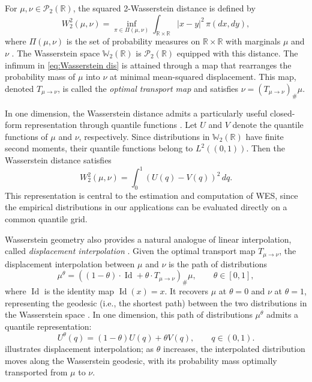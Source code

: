 \documentclass[a4paper, 11pt]{article}
\newcommand{\R}{\mathbb{R}}
\theoremstyle{definition}
\begin{document}
For $\mu,\nu\in\mathcal P_2(\R)$, the squared 2-Wasserstein distance is defined by
\begin{equation}\label{eq:Wasserstein dis}
W_2^2(\mu,\nu)
=
\inf_{\pi\in\Pi(\mu,\nu)}
\int_{\R\times\R} |x-y|^2\,\pi(dx,dy),
\end{equation}
where $\Pi(\mu,\nu)$ is the set of probability measures on $\R\times\R$ with marginals $\mu$ and $\nu$ \citep{villani2009optimal}.
The Wasserstein space $\mathbb{W}_2(\R)$ is $\mathcal P_2(\R)$ equipped with this distance.
The infimum in \eqref{eq:Wasserstein dis} is attained through a map that rearranges the probability mass of $\mu$ into $\nu$ at minimal mean-squared displacement.
This map, denoted $T_{\mu \to \nu}$, is called the \emph{optimal transport map} and satisfies $\nu = ( T_{\mu \to \nu} )_{\#} \mu$.

In one dimension, the Wasserstein distance admits a particularly useful closed-form representation through quantile functions \citep{Panaretos2020}. 
Let $U$ and $V$ denote the quantile functions of $\mu$ and $\nu$, respectively. 
Since distributions in $\mathbb{W}_2(\R)$ have finite second moments, their quantile functions belong to $L^2((0,1))$.
Then the Wasserstein distance satisfies
\begin{equation}\label{eq:wasserstein_quantile}
    W_2^2(\mu,\nu)
    =
    \int_0^1 ( U(q)-V(q) )^2\,dq .
\end{equation}
This representation is central to the estimation and computation of WES, since the empirical distributions in our applications can be evaluated directly on a common quantile grid.

Wasserstein geometry also provides a natural analogue of linear interpolation, called \emph{displacement interpolation} \citep{villani2009optimal}.
Given the optimal transport map $T_{\mu \to \nu}$, the displacement interpolation between $\mu$ and $\nu$ is the path of distributions
\begin{equation}\label{eq:wasserstein_geodesic}
    \mu^\theta
    =
    \left( (1-\theta) \cdot \operatorname{Id}
    +
    \theta \cdot T_{\mu \to \nu} \right)_{\#}\mu,
    \qquad
    \theta\in[0,1],
\end{equation}
where $\operatorname{Id}$ is the identity map $\operatorname{Id}(x) = x$.
It recovers $\mu$ at $\theta = 0$ and $\nu$ at $\theta=1$, representing the geodesic (i.e., the shortest path) between the two distributions in the Wasserstein space \citep{Ambrosio2024}.
In one dimension, this path of distributions $\mu^\theta$ admits a quantile representation:
\begin{equation}\label{eq:wasserstein_geodesic_quantile}
    U^\theta(q) = (1-\theta)U(q)+\theta V(q), \qquad q\in(0,1).
\end{equation}
 illustrates displacement interpolation; as $\theta$ increases, the interpolated distribution moves along the Wasserstein geodesic, with its probability mass optimally transported from $\mu$ to $\nu$.
\end{document}

